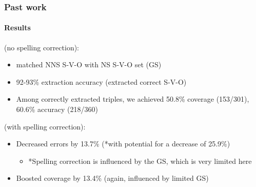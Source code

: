 \documentclass{beamer}
\begin{document}

\begin{frame}
\frametitle{Past work}
\framesubtitle{Results}
\citet{king:dickinson:13} (no spelling correction):

\begin{itemize}
\item matched NNS S-V-O with NS S-V-O set (GS)
\item 92-93\% extraction accuracy (extracted correct S-V-O)
\item Among correctly extracted triples, we achieved 50.8\% coverage (153/301), 60.6\% accuracy (218/360)
\end{itemize}
\medskip
\citet{king:dickinson:14} (with spelling correction):
\begin{itemize}
\item Decreased errors by 13.7\% (*with potential for a decrease of 25.9\%)
\begin{itemize}
\item *Spelling correction is influenced by the GS, which is very limited here
\end{itemize}
\item Boosted coverage by 13.4\% (again, influenced by limited GS)
\end{itemize}
\end{frame}
\end{document}
